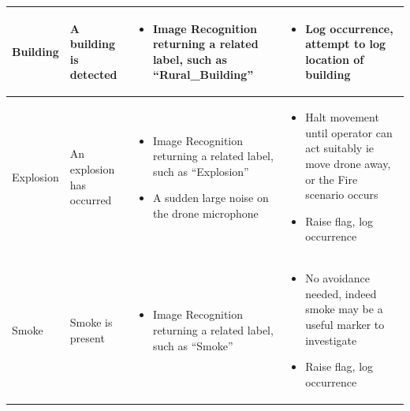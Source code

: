 \documentclass{article}
\begin{document}
\begin{table}[h]
\begin{tabularx}{\textwidth}{| >{\centering}m{1.5cm} | >{\centering}m{2cm} | X | X |}
    Building & \vspace{\baselineskip} A building is detected &
    \begin{itemize} [topsep=0pt, leftmargin=0cm,itemindent=.5cm,labelwidth=\itemindent,labelsep=0cm,align=left]
        \item Image Recognition returning a related label, such as “Rural\_Building”
    \end{itemize} &
    \begin{itemize} [topsep=0pt, leftmargin=0cm,itemindent=.5cm,labelwidth=\itemindent,labelsep=0cm,align=left]
        \item Log occurrence, attempt to log location of building
    \end{itemize} \\ \hline

    Explosion & \vspace{\baselineskip} An explosion has occurred &
    \begin{itemize} [topsep=0pt, leftmargin=0cm,itemindent=.5cm,labelwidth=\itemindent,labelsep=0cm,align=left]
        \item Image Recognition returning a related label, such as “Explosion”
        \item A sudden large noise on the drone microphone
    \end{itemize} &
    \begin{itemize} [topsep=0pt, leftmargin=0cm,itemindent=.5cm,labelwidth=\itemindent,labelsep=0cm,align=left]
        \item Halt movement until operator can act suitably ie move drone away, or the Fire scenario occurs
        \item Raise flag, log occurrence
    \end{itemize} \\ \hline

    Smoke & \vspace{\baselineskip} Smoke is present &
    \begin{itemize} [topsep=0pt, leftmargin=0cm,itemindent=.5cm,labelwidth=\itemindent,labelsep=0cm,align=left]
        \item Image Recognition returning a related label, such as “Smoke”
    \end{itemize} &
    \begin{itemize} [topsep=0pt, leftmargin=0cm,itemindent=.5cm,labelwidth=\itemindent,labelsep=0cm,align=left]
        \item No avoidance needed, indeed smoke may be a useful marker to investigate
        \item Raise flag, log occurrence
    \end{itemize} \\ \hline


\end{tabularx}
\end{table}
\end{document}
